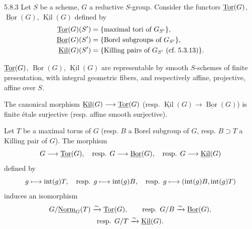 \begin{corollary}{5.8.3}\label{XXII.5.8.3}
Let $S$ be a scheme, $G$ a reductive $S$-group. Consider the functors $\underline{\operatorname{Tor}}(G)$, $\underline{\operatorname{Bor}}(G)$, $\underline{\operatorname{Kil}}(G)$ defined by
\[
\begin{aligned}
\underline{\operatorname{Tor}}(G)(S')&=\{\text{maximal tori of }G_{S'}\},\\
\underline{\operatorname{Bor}}(G)(S')&=\{\text{Borel subgroups of }G_{S'}\},\\
\underline{\operatorname{Kil}}(G)(S')&=\{\text{Killing pairs of }G_{S'}\text{ (cf.\kern.3em5.3.13)}\}.
\end{aligned}
\]
\begin{enumeratei}
\item $\underline{\operatorname{Tor}}(G)$, $\underline{\operatorname{Bor}}(G)$, $\underline{\operatorname{Kil}}(G)$ are representable by smooth $S$-schemes of finite presentation, with integral geometric fibers, and respectively affine, projective, affine over $S$.
\item The canonical morphism $\underline{\operatorname{Kil}}(G)\longrightarrow\underline{\operatorname{Tor}}(G)$ (resp. $\underline{\operatorname{Kil}}(G)\to\underline{\operatorname{Bor}}(G)$) is finite \'etale surjective (resp. affine smooth surjective).
\item Let $T$ be a maximal torus of $G$ (resp. $B$ a Borel subgroup of $G$, resp. $B\supset T$ a Killing pair of $G$). The morphism
\[
G\longrightarrow\underline{\operatorname{Tor}}(G),\quad\text{resp. }G\longrightarrow\underline{\operatorname{Bor}}(G),\quad\text{resp. }G\longrightarrow\underline{\operatorname{Kil}}(G)
\]
defined by
\[
g\longmapsto\operatorname{int}(g)T,\quad\text{resp. }g\longmapsto\operatorname{int}(g)B,\quad\text{resp. }g\longmapsto(\operatorname{int}(g)B,\operatorname{int}(g)T)
\]
induces an isomorphism
\[
\begin{gathered}
G/\underline{\mathrm{Norm}}_G(T)\xrightarrow{\sim}\underline{\operatorname{Tor}}(G),\qquad\text{resp. }G/B\xrightarrow{\sim}\underline{\operatorname{Bor}}(G),\\
\text{resp. }G/T\xrightarrow{\sim}\underline{\operatorname{Kil}}(G).
\end{gathered}
\]
\end{enumeratei}
\end{corollary}

